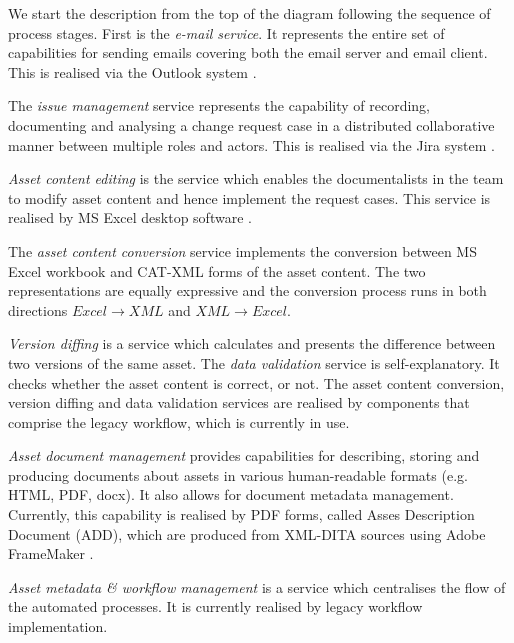 
	We start the description from the top of the diagram following the sequence of process stages. First is the \textit{e-mail service}. It represents the entire set of capabilities for sending emails covering both the email server and email client. This is realised via the Outlook system \citep{outlook}. 
	
	The \textit{issue management} service represents the capability of recording, documenting and analysing a change request case in a distributed collaborative manner between multiple roles and actors. This is realised via the Jira system \citep{jira}. 
	
	\textit{Asset content editing} is the service which enables the documentalists in the team to modify asset content and hence implement the request cases. This service is realised by MS Excel desktop software \citep{excel}.
	
	The \textit{asset content conversion} service implements the conversion between MS Excel workbook and CAT-XML forms of the asset content. The two representations are equally expressive and the conversion process runs in both directions $ Excel \rightarrow XML $ and $XML \rightarrow Excel $.
	
	\textit{Version diffing} is a service which calculates and presents the difference between two versions of the same asset. The \textit{data validation} service is self-explanatory. It checks whether the asset content is correct, or not. The asset content conversion, version diffing and data validation services are realised by components that comprise the legacy workflow, which is currently in use.
	
	\textit{Asset document management} provides capabilities for describing, storing and producing documents about assets in various human-readable formats (e.g. HTML, PDF, docx). It also allows for document metadata management. Currently, this capability is realised by PDF forms, called Asses Description Document (ADD), which are produced from XML-DITA sources \citep{dita-day2005introduction, dita-spec} using Adobe FrameMaker \citep{framemaker} . 
	
	\textit{Asset metadata \& workflow management} is a service which centralises the flow of the automated processes. It is currently realised by legacy workflow implementation. 
	
